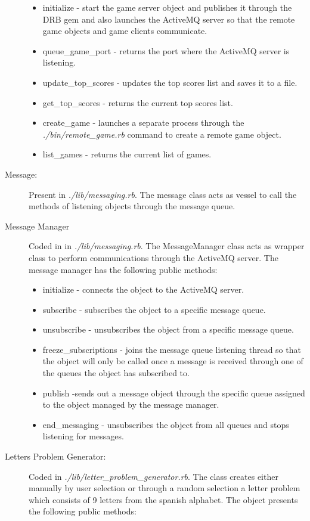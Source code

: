 \documentclass[a4paper,10pt,titlepage]{article}
\begin{document}
\begin{description}
	\begin{itemize}
		\item initialize - start the game server object and publishes it through the DRB gem and also launches the ActiveMQ server so that the remote game objects and game clients communicate.
		\item queue\_game\_port - returns the port where the ActiveMQ server is listening. 
		\item update\_top\_scores - updates the top scores list and saves it to a file.
		\item get\_top\_scores - returns the current top scores list.
		\item create\_game - launches a separate process through the \textit{./bin/remote\_game.rb} command to create a remote game object.  
		\item list\_games - returns the current list of games.
	\end{itemize} 
	\item[Message:] Present in \textit{./lib/messaging.rb}. The message class acts as vessel to call the methods of listening objects through the message queue. 
	\item[Message Manager] Coded in in \textit{./lib/messaging.rb}. The MessageManager class acts as wrapper class to perform communications through the ActiveMQ server. The message manager has the following public methods:
	\begin{itemize}
		\item initialize - connects the object to the ActiveMQ server.
		\item subscribe - subscribes the object to a specific message queue.
		\item unsubscribe - unsubscribes the object from a specific message queue.
		\item freeze\_subscriptions - joins the message queue listening thread so that the object will only be called once a message is received through one of the queues the object has subscribed to. 
		\item publish -sends out a message object through the specific queue assigned to the object managed by the message manager.
		\item end\_messaging - unsubscribes the object from all queues and stops listening for messages.
	\end{itemize}
	\item[Letters Problem Generator:] Coded in \textit{./lib/letter\_problem\_generator.rb}. The class creates either manually by user selection or through a random selection a letter problem which consists of 9 letters from the spanish alphabet. The object presents the following public methods:

\end{description}
\end{document}
